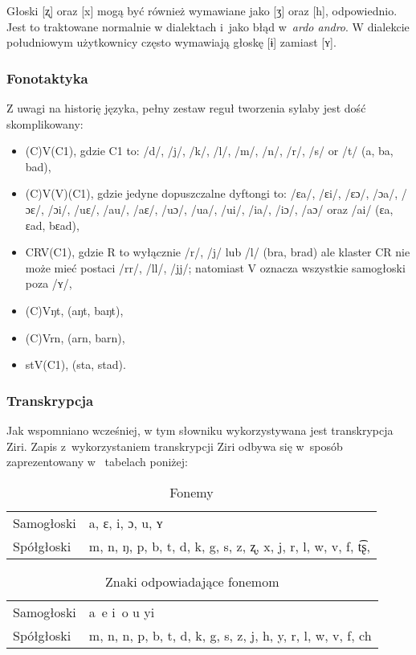 \begin{spacing}{1.1}
Głoski [ʐ] oraz [x] mogą być również wymawiane jako [ʒ] oraz [h], odpowiednio.
Jest to traktowane normalnie w dialektach i~jako błąd w~\emph{ardo andro}. W
dialekcie południowym użytkownicy często wymawiają głoskę [ɨ] zamiast [ʏ].

\subsubsection{Fonotaktyka}

Z uwagi na historię języka, pełny zestaw reguł tworzenia sylaby jest dość
skomplikowany:

\begin{itemize}
	\item (C)V(C1), gdzie C1 to: /d/, /j/, /k/, /l/, /m/, /n/, /r/, /s/ or /t/ (a, ba, bad),
	\item (C)V(V)(C1), gdzie jedyne dopuszczalne dyftongi to: /ɛa/, /ɛi/, /ɛɔ/, /ɔa/, /ɔɛ/, /ɔi/, /uɛ/, /au/, /aɛ/, /uɔ/, /ua/, /ui/, /ia/, /iɔ/, /aɔ/ oraz /ai/ (ɛa, ɛad, bɛad),
	\item CRV(C1), gdzie R to wyłącznie /r/, /j/ lub /l/ (bra, brad) ale klaster CR nie może mieć postaci /rr/, /ll/, /jj/; natomiast V oznacza wszystkie samogłoski poza /ʏ/,
	\item (C)Vŋt, (aŋt, baŋt),
	\item (C)Vrn, (arn, barn),
	\item stV(C1), (sta, stad).
\end{itemize}

\subsubsection{Transkrypcja}

Jak wspomniano wcześniej, w tym słowniku wykorzystywana jest transkrypcja Ziri. 
Zapis z~wykorzystaniem transkrypcji Ziri odbywa się w~sposób zaprezentowany w~
tabelach poniżej:

\begin{table}[ht]
	\centering
	\caption{Fonemy}
	\begin{tabular}{ll} \toprule
		Samogłoski & a, ɛ, i, ɔ, u, ʏ \\
		Spółgłoski & m, n, ŋ, p, b, t, d, k, g, s, z, ʐ, x, j, r, l, w, v, f, t͡ʂ, \\\bottomrule
	\end{tabular}
	\label{tab:phonemes}
\end{table}

\begin{table}[ht]
\centering
\caption{Znaki odpowiadające fonemom}
\begin{tabular}{ll} \toprule
	Samogłoski & a~e i~o u yi \\
	Spółgłoski & m, n, n, p, b, t, d, k, g, s, z, j, h, y, r, l, w, v, f, ch \\\bottomrule
\end{tabular}
\label{tab:chars}
\end{table}


\end{spacing}
